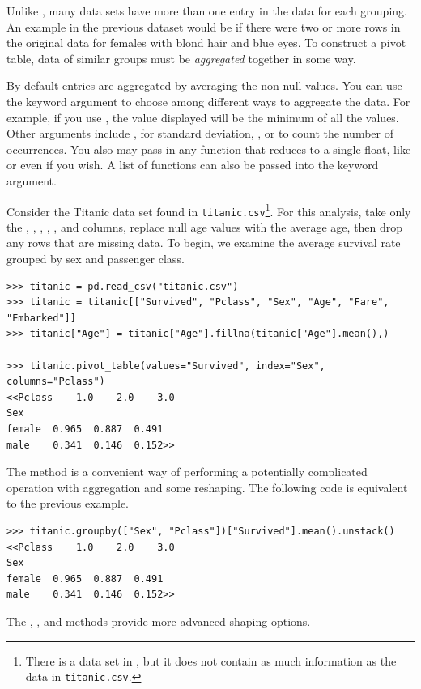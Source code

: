 Unlike , many data sets have more than one entry in the data for each grouping.
An example in the previous dataset would be if there were two or more rows in the original data for females with blond hair and blue eyes.
To construct a pivot table, data of similar groups must be \emph{aggregated} together in some way.

By default entries are aggregated by averaging the non-null values.
You can use the keyword argument  to choose among different ways to aggregate the data.
For example, if you use , the value displayed will be the minimum of all the values.
Other arguments include ,  for standard deviation, , or  to count the number of occurrences.
You also may pass in any function that reduces to a single float, like  or even  if you wish.
A list of functions can also be passed into the  keyword argument.

Consider the Titanic data set found in \texttt{titanic.csv}\footnote{There is a  data set in , but it does not contain as much information as the data in \texttt{titanic.csv}.}.
For this analysis, take only the , , , , , and  columns, replace null age values with the average age, then drop any rows that are missing data.
To begin, we examine the average survival rate grouped by sex and passenger class.

\begin{lstlisting}
>>> titanic = pd.read_csv("titanic.csv")
>>> titanic = titanic[["Survived", "Pclass", "Sex", "Age", "Fare", "Embarked"]]
>>> titanic["Age"] = titanic["Age"].fillna(titanic["Age"].mean(),)

>>> titanic.pivot_table(values="Survived", index="Sex", columns="Pclass")
<<Pclass    1.0    2.0    3.0
Sex
female  0.965  0.887  0.491
male    0.341  0.146  0.152>>
\end{lstlisting}

\begin{info} %
The  method is a convenient way of performing a potentially complicated  operation with aggregation and some reshaping.
The following code is equivalent to the previous example.

\begin{lstlisting}
>>> titanic.groupby(["Sex", "Pclass"])["Survived"].mean().unstack()
<<Pclass    1.0    2.0    3.0
Sex
female  0.965  0.887  0.491
male    0.341  0.146  0.152>>
\end{lstlisting}

The , , and  methods provide more advanced shaping options.
\end{info}

